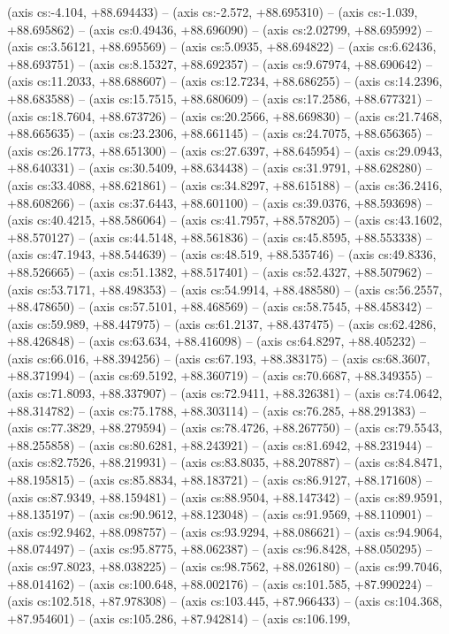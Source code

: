     (axis cs:-4.104,    +88.694433) --  (axis cs:-2.572,    +88.695310) --  (axis cs:-1.039,    +88.695862) --  (axis cs:0.49436,    +88.696090) --  (axis cs:2.02799,    +88.695992) --  (axis cs:3.56121,    +88.695569) --  (axis cs:5.0935,    +88.694822) --  (axis cs:6.62436,    +88.693751) --  (axis cs:8.15327,    +88.692357) --  (axis cs:9.67974,    +88.690642) --  (axis cs:11.2033,    +88.688607) --  (axis cs:12.7234,    +88.686255) --  (axis cs:14.2396,    +88.683588) --  (axis cs:15.7515,    +88.680609) --  (axis cs:17.2586,    +88.677321) --  (axis cs:18.7604,    +88.673726) --  (axis cs:20.2566,    +88.669830) --  (axis cs:21.7468,    +88.665635) --  (axis cs:23.2306,    +88.661145) --  (axis cs:24.7075,    +88.656365) --  (axis cs:26.1773,    +88.651300) --  (axis cs:27.6397,    +88.645954) --  (axis cs:29.0943,    +88.640331) --  (axis cs:30.5409,    +88.634438) --  (axis cs:31.9791,    +88.628280) --  (axis cs:33.4088,    +88.621861) --  (axis cs:34.8297,    +88.615188) --  (axis cs:36.2416,    +88.608266) --  (axis cs:37.6443,    +88.601100) --  (axis cs:39.0376,    +88.593698) --  (axis cs:40.4215,    +88.586064) --  (axis cs:41.7957,    +88.578205) --  (axis cs:43.1602,    +88.570127) --  (axis cs:44.5148,    +88.561836) --  (axis cs:45.8595,    +88.553338) --  (axis cs:47.1943,    +88.544639) --  (axis cs:48.519,    +88.535746) --  (axis cs:49.8336,    +88.526665) --  (axis cs:51.1382,    +88.517401) --  (axis cs:52.4327,    +88.507962) --  (axis cs:53.7171,    +88.498353) --  (axis cs:54.9914,    +88.488580) --  (axis cs:56.2557,    +88.478650) --  (axis cs:57.5101,    +88.468569) --  (axis cs:58.7545,    +88.458342) --  (axis cs:59.989,    +88.447975) --  (axis cs:61.2137,    +88.437475) --  (axis cs:62.4286,    +88.426848) --  (axis cs:63.634,    +88.416098) --  (axis cs:64.8297,    +88.405232) --  (axis cs:66.016,    +88.394256) --  (axis cs:67.193,    +88.383175) --  (axis cs:68.3607,    +88.371994) --  (axis cs:69.5192,    +88.360719) --  (axis cs:70.6687,    +88.349355) --  (axis cs:71.8093,    +88.337907) --  (axis cs:72.9411,    +88.326381) --  (axis cs:74.0642,    +88.314782) --  (axis cs:75.1788,    +88.303114) --  (axis cs:76.285,    +88.291383) --  (axis cs:77.3829,    +88.279594) --  (axis cs:78.4726,    +88.267750) --  (axis cs:79.5543,    +88.255858) --  (axis cs:80.6281,    +88.243921) --  (axis cs:81.6942,    +88.231944) --  (axis cs:82.7526,    +88.219931) --  (axis cs:83.8035,    +88.207887) --  (axis cs:84.8471,    +88.195815) --  (axis cs:85.8834,    +88.183721) --  (axis cs:86.9127,    +88.171608) --  (axis cs:87.9349,    +88.159481) --  (axis cs:88.9504,    +88.147342) --  (axis cs:89.9591,    +88.135197) --  (axis cs:90.9612,    +88.123048) --  (axis cs:91.9569,    +88.110901) --  (axis cs:92.9462,    +88.098757) --  (axis cs:93.9294,    +88.086621) --  (axis cs:94.9064,    +88.074497) --  (axis cs:95.8775,    +88.062387) --  (axis cs:96.8428,    +88.050295) --  (axis cs:97.8023,    +88.038225) --  (axis cs:98.7562,    +88.026180) --  (axis cs:99.7046,    +88.014162) --  (axis cs:100.648,    +88.002176) --  (axis cs:101.585,    +87.990224) --  (axis cs:102.518,    +87.978308) --  (axis cs:103.445,    +87.966433) --  (axis cs:104.368,    +87.954601) --  (axis cs:105.286,    +87.942814) --  (axis cs:106.199,   